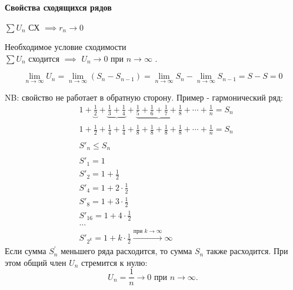 \par
\textbf{Свойства сходящихся рядов}

\begin{sv}
    $\sum U_n $ СХ $\implies r_n\to 0$ 
\end{sv}


\begin{sv}
    Необходимое условие сходимости\\
    $\sum{U_n}$ сходится $\implies$ $U_n \to 0$ при $n\to \infty$ . 

    \begin{myproof}
    \begin{equation}
        \lim_{n\to\infty} U_n 
        = \lim_{n\to\infty} (S_n - S_{n - 1})
        = \lim_{n\to\infty}S_n - \lim_{n\to\infty} S_{n-1} 
        = S - S 
        = 0
    \end{equation}
\end{myproof}

NB: свойство не работает в обратную сторону. Пример - гармонический ряд: 
    \begin{equation}
        \begin{aligned}
            &1 + \underbrace{\frac{1}{2}}_{\text{}} + \underbrace{\frac{1}{3} + \frac{1}{4}}_{\text{}} + \underbrace{\frac{1}{5} + \frac{1}{6} + \frac{1}{7} + \frac{1}{8}}_{\text{}} + \cdots + \frac{1}{n} = S_n \\
            &1 + \frac{1}{2} + \frac{1}{4} + \frac{1}{4} + \frac{1}{8} + \frac{1}{8} + \frac{1}{8} + \frac{1}{8} + \cdots + \frac{1}{n} = S_n \\ \\
            &S'_n \leq S_n \\\\
            &S'_1 = 1 \\
            &S'_2 = 1 + \frac{1}{2} \\
            &S'_4 = 1 + 2 \cdot \frac{1}{2} \\
            &S'_8 = 1 + 3 \cdot \frac{1}{2} \\
            &S'_{16} = 1 + 4 \cdot \frac{1}{2} \\
            &\dots \\
            &S'_{2^k} = 1 + k \cdot \frac{1}{2} \xrightarrow{\text{при $k\to\infty$}} \infty 
        \end{aligned} 
    \end{equation}
    Если сумма \( S^{'}_n \) меньшего ряда расходится, то сумма \( S_n \) также расходится. При этом общий член \( U_n \) стремится к нулю:
    \[
    U_n = \frac{1}{n} \to 0 \text{ при } n \to \infty.
    \]

\end{sv}
